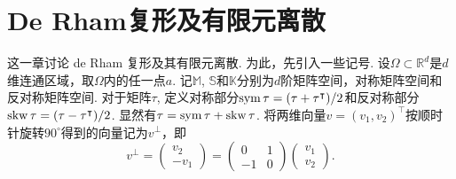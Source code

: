 \chapter{De Rham复形及有限元离散}

这一章讨论 de Rham 复形及其有限元离散. 为此，先引入一些记号.
设$\Omega\subset\mathbb R^d$是$d$维连通区域，取$\Omega$内的任一点$a$. 
记$\mathbb M$, $\mathbb S$和$\mathbb K$分别为$d$阶矩阵空间，对称矩阵空间和反对称矩阵空间.
对于矩阵$\tau$, 定义对称部分$\operatorname{sym}\tau=(\tau+\tau^{\intercal})/2$和反对称部分$\operatorname{skw}\tau=(\tau-\tau^{\intercal})/2$. 显然有$\tau=\operatorname{sym}\tau+\operatorname{skw}\tau$.
将两维向量$v=(v_1, v_2)^{\intercal}$按顺时针旋转$90^{\circ}$得到的向量记为$v^{\perp}$，即
$$
v^{\perp}=\begin{pmatrix}
v_2 \\
-v_1
\end{pmatrix}=\begin{pmatrix}
0 & 1 \\
-1 & 0
\end{pmatrix}\begin{pmatrix}
v_1 \\
v_2
\end{pmatrix}.
$$

